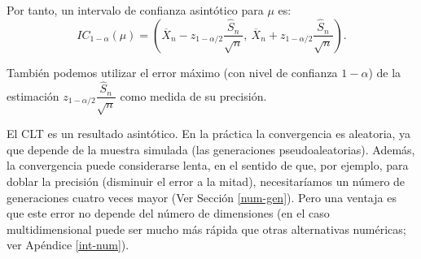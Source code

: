 \documentclass[
  10pt,
]{book}
\theoremstyle{break}
\theoremstyle{nonumberplain}
\begin{document}
Por tanto, un intervalo de confianza asintótico para \(\mu\) es:
\[IC_{1-\alpha }(\mu ) = \left( \overline{X}_{n}
- z_{1-\alpha /2}\dfrac{\widehat{S}_{n}}{\sqrt{n}},\ 
\overline{X}_n+z_{1-\alpha /2}\dfrac{\widehat{S}_{n}}{\sqrt{n}} \right).\]

También podemos utilizar el error máximo (con nivel de confianza \(1-\alpha\)) de la estimación \(z_{1-\alpha /2}\dfrac{\widehat{S}_{n}}{\sqrt{n}}\) como medida de su precisión.

El CLT es un resultado asintótico. En la práctica la convergencia es aleatoria, ya que depende de la muestra simulada (las generaciones pseudoaleatorias).
Además, la convergencia puede considerarse lenta, en el sentido de que, por ejemplo, para doblar la precisión (disminuir el error a la mitad), necesitaríamos un número de generaciones cuatro veces mayor (Ver Sección \ref{num-gen}).
Pero una ventaja es que este error no depende del número de dimensiones (en el caso multidimensional puede ser mucho más rápida que otras alternativas numéricas; ver Apéndice \ref{int-num}).
\end{document}
